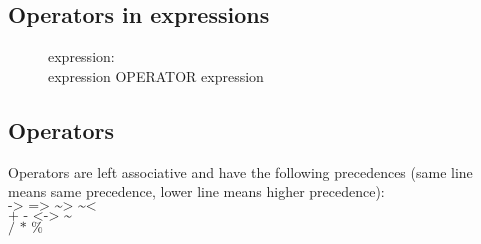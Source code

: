 \documentclass[12pt]{article}
\begin{document}
\subsection{Operators in expressions}
\begin{description}
  \item[]expression: \hfill \\
    expression OPERATOR expression
\end{description}

\subsection{Operators}
Operators are left associative and have the following precedences (same line
means same precedence, lower line means higher precedence):\\
$\texttt{-> => \textasciitilde> \textasciitilde<}$\\
$\texttt{+ - <-> \textasciitilde}$\\
$\texttt{/ * \%}$
\end{document}

